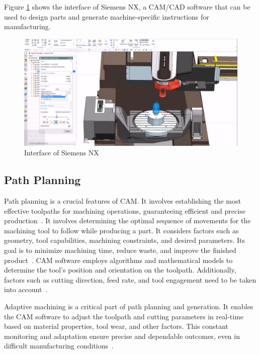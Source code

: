 
Figure \ref{CAMinterface} shows the interface of Siemens NX, a \acrshort{CAM}/\acrshort{CAD} software that can be used to design parts and generate machine-specific instructions for manufacturing. 
\newpage
\begin{figure}[H]
	\centerline{\includegraphics[width=1\textwidth]{figures/CAM.png}}
	\caption{Interface of Siemens NX~\cite{NXManufacturing.2015}}
	\label{CAMinterface}
\end{figure}


\subsection{Path Planning}\label{papla}
Path planning is a crucial features of \acrshort{CAM}. It involves establishing the most effective toolpaths for machining operations, guaranteeing efficient and precise production~\cite{Brecher.2013}. It involves determining the optimal sequence of movements for the machining tool to follow while producing a part. It considers factors such as geometry, tool capabilities, machining constraints, and desired parameters. Its goal is to minimize machining time, reduce waste, and improve the finished product~\cite{Xu.2015}. \acrshort{CAM} software employs algorithms and mathematical models to determine the tool's position and orientation on the toolpath. Additionally, factors such as cutting direction, feed rate, and tool engagement need to be taken into account~\cite{Tunc.2017}.

Adaptive machining is a critical part of path planning and generation. It enables the \acrshort{CAM} software to adjust the toolpath and cutting parameters in real-time based on material properties, tool wear, and other factors. This constant monitoring and adaptation ensure precise and dependable outcomes, even in difficult manufacturing conditions~\cite{Liu.2017}.

